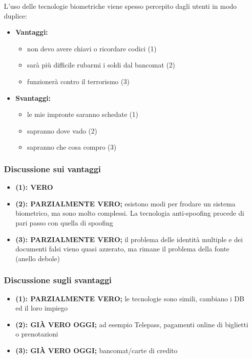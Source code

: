 L'uso delle tecnologie biometriche viene spesso percepito dagli utenti in modo duplice:
\begin{itemize}
    \item \textbf{Vantaggi:}
    \begin{itemize}
        \item non devo avere chiavi o ricordare codici (1)
        \item sarà più difficile rubarmi i soldi dal bancomat (2)
        \item funzionerà contro il terrorismo (3)
    \end{itemize}
    \item \textbf{Svantaggi:}
    \begin{itemize}
        \item le mie impronte saranno schedate (1)
        \item sapranno dove vado (2)
        \item sapranno che cosa compro (3)
    \end{itemize}
\end{itemize}

\subsubsection{Discussione sui vantaggi}
\begin{itemize}
    \item \textbf{(1): VERO}
    \item \textbf{(2): PARZIALMENTE VERO;} esistono modi per frodare un sistema biometrico, ma sono molto complessi. La tecnologia anti-spoofing procede di pari passo con quella di spoofing
    \item \textbf{(3): PARZIALMENTE VERO;} il problema delle identità multiple e dei documenti falsi vieno quasi azzerato, ma rimane il problema della fonte (anello debole)
\end{itemize}

\subsubsection{Discussione sugli svantaggi}
\begin{itemize}
    \item \textbf{(1): PARZIALMENTE VERO;} le tecnologie sono simili, cambiano i DB ed il loro impiego
    \item \textbf{(2): GIÀ VERO OGGI;} ad esempio Telepass, pagamenti online di biglietti o prenotazioni
    \item \textbf{(3): GIÀ VERO OGGI;} bancomat/carte di credito
\end{itemize}

